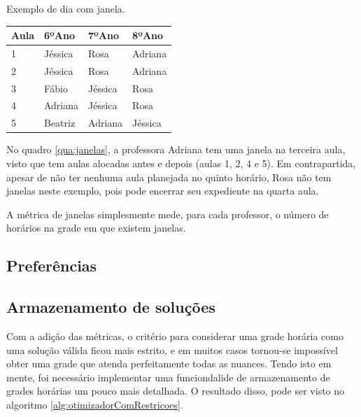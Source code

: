 \begin{quadro}[!htb]
	\centering
	\caption{Exemplo de dia com janela.\label{qua:janelas}}
	\begin{tabular}{|p{3cm}|p{3cm}|p{3cm}|p{3cm}|}
		\hline
		\textbf{Aula} & \textbf{6ºAno} & \textbf{7ºAno} & \textbf{8ºAno} \\
		\hline
		1 & Jéssica & Rosa & Adriana \\
		\hline
		2 & Jéssica & Rosa & Adriana \\
		\hline
		3 & Fábio & Jéssica & Rosa \\
		\hline
		4 & Adriana & Jéssica & Rosa \\
		\hline
		5 & Beatriz & Adriana & Jéssica \\
		\hline
	\end{tabular}
\end{quadro}

No quadro \ref{qua:janelas}, a professora Adriana tem uma janela na terceira aula, visto que tem aulas alocadas antes e depois (aulas 1, 2, 4 e 5). Em contrapartida, apesar de não ter nenhuma aula planejada no quinto horário, Rosa não tem janelas neste exemplo, pois pode encerrar seu expediente na quarta aula.

A métrica de janelas simplesmente mede, para cada professor, o número de horários na grade em que existem janelas.

\subsection{Preferências}

\subsection{Armazenamento de soluções}
\label{subsec:salvamento}

Com a adição das métricas, o critério para considerar uma grade horária como uma solução válida ficou mais estrito, e em muitos casos tornou-se impossível obter uma grade que atenda perfeitamente todas as nuances. Tendo isto em mente, foi necessário implementar uma funciondalide de armazenamento de grades horárias um pouco mais detalhada. O resultado disso, pode ser visto no algoritmo \ref{alg:otimizadorComRestricoes}.

